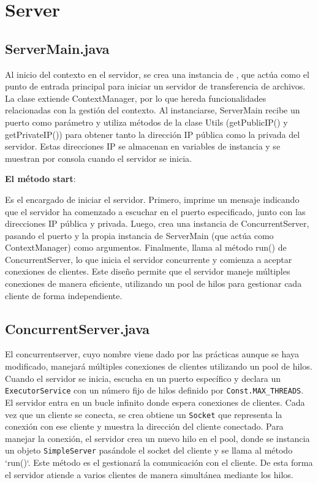\documentclass[a4paper, 12pt]{report}
\begin{document}
\chapter{Server}

\section{ServerMain.java}

Al inicio del contexto en el servidor, se crea una instancia de , que actúa como el punto de
entrada principal para iniciar un servidor de transferencia de archivos. La clase extiende ContextManager,
por lo que hereda funcionalidades relacionadas con la gestión del contexto. Al instanciarse, ServerMain recibe
un puerto como parámetro y utiliza métodos de la clase Utils (getPublicIP() y getPrivateIP())
para obtener tanto la dirección IP pública como la privada del
servidor. Estas direcciones IP se almacenan en variables de instancia y se muestran por consola cuando el servidor se inicia.

\textbf{El método start}:

Es el encargado de iniciar el servidor. Primero, imprime un mensaje
indicando que el servidor ha comenzado a escuchar en el puerto
especificado, junto con las direcciones IP pública y privada. Luego,
crea una instancia de ConcurrentServer, pasando el puerto y la propia instancia de ServerMain (que actúa como ContextManager) como argumentos. Finalmente, llama al método run() de ConcurrentServer,
lo que inicia el servidor concurrente y comienza a aceptar conexiones
de clientes. Este diseño permite que el servidor maneje múltiples
conexiones de manera eficiente, utilizando un pool de hilos para
gestionar cada cliente de forma independiente.



\section{ConcurrentServer.java}

El concurrentserver, cuyo nombre viene dado por las prácticas aunque se haya modificado, manejará múltiples
conexiones de clientes utilizando un pool de hilos. Cuando el servidor se inicia, escucha en un puerto
específico y declara un \texttt{ExecutorService}  con un número fijo de hilos definido por
\texttt{Const.MAX\_THREADS}. El servidor entra en un bucle infinito donde espera conexiones de clientes. Cada
vez que un cliente se conecta, se crea obtiene un \texttt{Socket} que
representa la conexión con ese cliente y muestra la dirección del cliente
conectado. Para manejar la conexión, el servidor crea un nuevo hilo en el pool, donde se instancia un
objeto \texttt{SimpleServer} pasándole el socket del cliente y se llama al método `run()`. Este método es el
gestionará la comunicación con el cliente. De esta forma el servidor atiende a varios
clientes de manera simultánea mediante los hilos.
\end{document}
